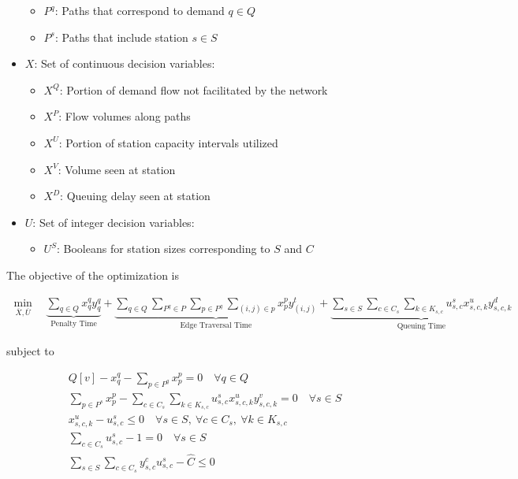 \begin{itemize}
\begin{itemize}
		\item $P^q$: Paths that correspond to demand $q \in Q$
		\item $P^s$: Paths that include station $s \in S$
	\end{itemize}
	\item $X$: Set of continuous decision variables: \begin{itemize}
		\item $X^Q$: Portion of demand flow not facilitated by the network
		\item $X^P$: Flow volumes along paths
		\item $X^U$: Portion of station capacity intervals utilized
		\item $X^V$: Volume seen at station
		\item $X^D$: Queuing delay seen at station
	\end{itemize}
	\item $U$: Set of integer decision variables: \begin{itemize}
		\item $U^S$: Booleans for station sizes corresponding to $S$ and $C$
	\end{itemize}
\end{itemize}


The objective of the optimization is

\begin{gather}
	\min_{\overline{X},\overline{U}}\quad \underbrace{\sum_{q \in Q} x^q_qy^q_q}_{\text{Penalty Time}} + \underbrace{\sum_{q \in Q}\sum_{P^q \in P}\sum_{p \in P^q}\sum_{(i, j) \in p} x^p_py^t_{(i, j)}}_{\text{Edge Traversal Time}} + \underbrace{\sum_{s \in S}\sum_{c \in C_s}
		\sum_{k \in K_{s, c}} u^s_{s, c}x^u_{s, c, k}y^d_{s, c, k}}_{\text{Queuing Time}} \label{eq:tm:obj}
\end{gather}

subject to

\begin{gather}
	Q[v] - x^q_q - \sum_{p \in P^q}x^p_p = 0 \quad \forall q \in Q \label{eq:tm:flow_dem} \\
	\sum_{p \in P^s} x^p_p - \sum_{c \in C_s}
	\sum_{k \in K_{s, c}} u^s_{s, c}x^u_{s, c, k}y^v_{s, c, k} = 0 \quad \forall s \in S \label{eq:tm:flow_cons} \\
	x^u_{s, c, k} - u^s_{s, c} \leq 0 \quad \forall s \in S, \ \forall c \in C_s,\ \forall k\in K_{s, c} \label{eq:tm:sz_int} \\
	\sum_{c \in C_s} u^s_{s, c} - 1 = 0 \quad \forall s \in S \label{eq:tm:chg_unity} \\
	\sum_{s \in S}\sum_{c \in C_s} y^c_{s, c}u^s_{s, c} - \hat{C} \leq 0 \label{eq:tm:chg_tot}
\end{gather}

